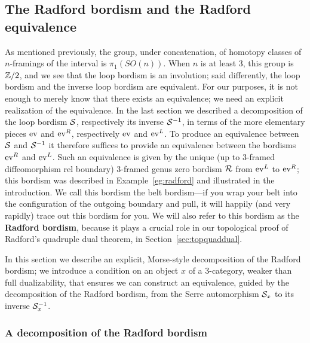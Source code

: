 \documentclass{amsart}
\begin{document}
\subsection{The Radford bordism and the Radford equivalence} \label{sec:Radford}


As mentioned previously, the group, under concatenation, of homotopy classes of $n$-framings of the interval is $\pi_1(SO(n))$.  When $n$ is at least 3, this group is $\mathbb Z/2$, and we see that the loop bordism is an involution; said differently, the loop bordism and the inverse loop bordism are equivalent.  For our purposes, it is not enough to merely know that there exists an equivalence; we need an explicit realization of the equivalence.  In the last section we described a decomposition of the loop bordism $\mathcal S$, respectively its inverse $\mathcal S^{-1}$, in terms of the more elementary pieces $\mathrm{ev}$ and $\mathrm{ev}^R$, respectively $\mathrm{ev}$ and $\mathrm{ev}^L$.   To produce an equivalence between $\mathcal S$ and $\mathcal S^{-1}$ it therefore suffices to provide an equivalence between the bordisms $\mathrm{ev}^R$ and $\mathrm{ev}^L$.  Such an equivalence is given by the unique (up to 3-framed diffeomorphism rel boundary) 3-framed genus zero bordism $\mathcal R$ from $\mathrm{ev}^L$ to $\mathrm{ev}^R$; this bordism was described in Example~\ref{eg:radford} and illustrated in the introduction.  We call this bordism the belt bordism---if you wrap your belt into the configuration of the outgoing boundary and pull, it will happily (and very rapidly) trace out this bordism for you.  We will also refer to this bordism as the {\bfseries Radford bordism}, because it plays a crucial role in our topological proof of Radford's quadruple dual theorem, in Section~\ref{sec:topquaddual}.

In this section we describe an explicit, Morse-style decomposition of the Radford bordism; we introduce a condition on an object $x$ of a 3-category, weaker than full dualizability, that ensures we can construct an equivalence, guided by the decomposition of the Radford bordism, from the Serre automorphism $\mathcal S_x$ to its inverse $\mathcal S_x^{-1}$.

\subsubsection{A decomposition of the Radford bordism}
\end{document}
